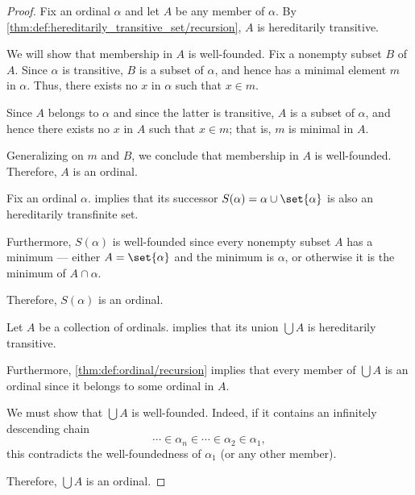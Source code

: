 \begin{proof}
   Fix an ordinal \( \alpha \) and let \( A \) be any member of \( \alpha \). By \cref{thm:def:hereditarily_transitive_set/recursion}, \( A \) is hereditarily transitive.

  We will show that membership in \( A \) is well-founded. Fix a nonempty subset \( B \) of \( A \). Since \( \alpha \) is transitive, \( B \) is a subset of \( \alpha \), and hence has a minimal element \( m \) in \( \alpha \). Thus, there exists no \( x \) in \( \alpha \) such that \( x \in m \).

  Since \( A \) belongs to \( \alpha \) and since the latter is transitive, \( A \) is a subset of \( \alpha \), and hence there exists no \( x \) in \( A \) such that \( x \in m \); that is, \( m \) is minimal in \( A \).

  Generalizing on \( m \) and \( B \), we conclude that membership in \( A \) is well-founded. Therefore, \( A \) is an ordinal.

   Fix an ordinal \( \alpha \).  implies that its successor \( S(\alpha) = \alpha \cup \set{ \alpha } \) is also an hereditarily transfinite set.

  Furthermore, \( S(\alpha) \) is well-founded since every nonempty subset \( A \) has a minimum --- either \( A = \set{ \alpha } \) and the minimum is \( \alpha \), or otherwise it is the minimum of \( A \cap \alpha \).

  Therefore, \( S(\alpha) \) is an ordinal.

   Let \( A \) be a collection of ordinals.  implies that its union \( \bigcup A \) is hereditarily transitive.

  Furthermore, \cref{thm:def:ordinal/recursion} implies that every member of \( \bigcup A \) is an ordinal since it belongs to some ordinal in \( A \).

  We must show that \( \bigcup A \) is well-founded. Indeed, if it contains an infinitely descending chain
  \begin{equation*}
    \cdots \in \alpha_n \in \cdots \in \alpha_2 \in \alpha_1,
  \end{equation*}
  this contradicts the well-foundedness of \( \alpha_1 \) (or any other member).

  Therefore, \( \bigcup A \) is an ordinal.


\end{proof}
